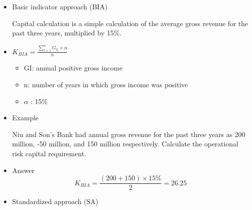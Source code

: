 \begin{itemize}
\item Basic indicator approach (BIA)

Capital calculation is a simple calculation of the average gross revenue for the past three years, multiplied by 15\%.

\item \( K_{BIA} = \frac{\sum_{i=1}^{n} G_{I_i} \times \alpha}{n} \)
    \begin{itemize}
    \item GI: annual positive gross income
    \item n: number of years in which gross income was positive
    \item $\alpha$ : 15\%
    \end{itemize}

\item Example

Niu and Son's Bank had annual gross revenue for the past three years as 200 million, -50 million, and 150 million respectively. Calculate the operational risk capital requirement.


\item Answer
    \begin{equation}
    K_{BIA} = \frac{(200 + 150) \times 15\%}{2} = 26.25
    \end{equation}

\item Standardized approach (SA)


\end{itemize}
